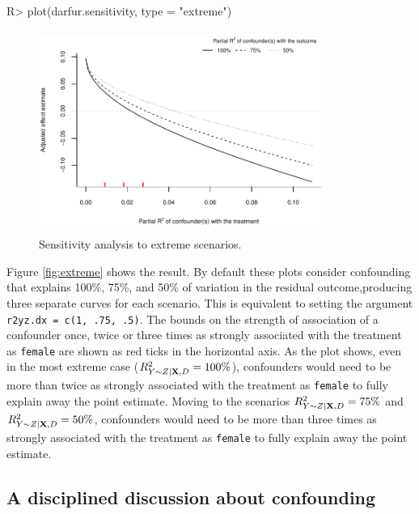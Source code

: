 \documentclass[
]{jss}
\begin{document}
\begin{CodeChunk}

\begin{CodeInput}
R> plot(darfur.sensitivity, type = "extreme")
\end{CodeInput}
\begin{figure}[t]

{\centering \includegraphics[width=350px,height=250px]{jss_sensemakr_files/figure-latex/darfur_extreme-1} 

}

\caption{\label{fig:extreme}Sensitivity analysis to extreme scenarios.}\label{fig:darfur_extreme}
\end{figure}
\end{CodeChunk}

Figure \ref{fig:extreme} shows the result. By default these plots
consider confounding that explains 100\%, 75\%, and 50\% of variation in
the residual outcome,producing three separate curves for each scenario.
This is equivalent to setting the argument
\texttt{r2yz.dx\ =\ c(1,\ .75,\ .5)}. The bounds on the strength of
association of a confounder once, twice or three times as strongly
associated with the treatment as \texttt{female} are shown as red ticks
in the horizontal axis. As the plot shows, even in the most extreme case
(\(R^2_{Y\sim Z| {\bf X}, D}=100\%\)), confounders would need to be more
than twice as strongly associated with the treatment as \texttt{female}
to fully explain away the point estimate. Moving to the scenarios
\(R^2_{Y\sim Z| {\bf X}, D}=75\%\) and
\(R^2_{Y\sim Z| {\bf X}, D}=50\%\), confounders would need to be more
than three times as strongly associated with the treatment as
\texttt{female} to fully explain away the point estimate.

\hypertarget{lecturing}{%
\subsection{A disciplined discussion about
confounding}\label{lecturing}}
\end{document}
